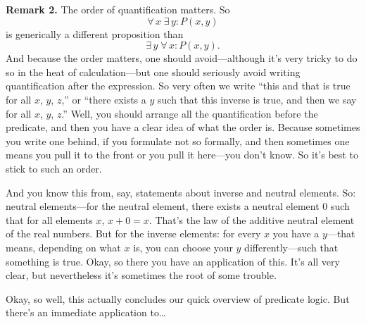 \textbf{Remark 2.} The order of quantification matters. So
\[
\forall\, x\; \exists\, y : P(x, y)
\]
is generically a different proposition than
\[
\exists\, y\; \forall\, x : P(x, y).
\]
And because the order matters, one should avoid---although it's very tricky to do so in the heat of calculation---but one should seriously avoid writing quantification after the expression. So very often we write ``this and that is true for all $x$, $y$, $z$,'' or ``there exists a $y$ such that this inverse is true, and then we say for all $x$, $y$, $z$.'' Well, you should arrange all the quantification before the predicate, and then you have a clear idea of what the order is. Because sometimes you write one behind, if you formulate not so formally, and then sometimes one means you pull it to the front or you pull it here---you don't know. So it's best to stick to such an order.

And you know this from, say, statements about inverse and neutral elements. So: neutral elements---for the neutral element, there exists a neutral element $0$ such that for all elements $x$, $x + 0 = x$. That's the law of the additive neutral element of the real numbers. But for the inverse elements: for every $x$ you have a $y$---that means, depending on what $x$ is, you can choose your $y$ differently---such that something is true. Okay, so there you have an application of this. It's all very clear, but nevertheless it's sometimes the root of some trouble.

Okay, so well, this actually concludes our quick overview of predicate logic. But there's an immediate application to\ldots
